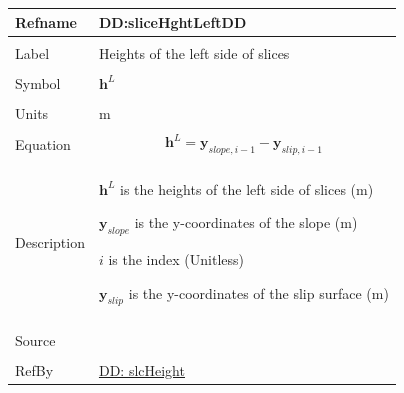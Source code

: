 \documentclass[12pt]{article}
\begin{document}
\noindent \begin{minipage}{\textwidth}
          \begin{tabular}{>{\raggedright}p{}>{\raggedright\arraybackslash}p{}}
          \toprule \textbf{Refname} & \textbf{DD:sliceHghtLeftDD}
          \label{DD:sliceHghtLeftDD}
          \\ \midrule \\
          Label & Heights of the left side of slices
          \\ \midrule \\
          Symbol & ${\mathbf{h}^{L}}$
          \\ \midrule \\
          Units & m
          \\ \midrule \\
          Equation & \begin{displaymath}
                     {\mathbf{h}^{L}}={\mathbf{y}_{slope,i-1}}-{\mathbf{y}_{slip,i-1}}
                     \end{displaymath}
          \\ \midrule \\
          Description & \begin{symbDescription}
                        \item{${\mathbf{h}^{L}}$ is the heights of the left side of slices (m)}
                        \item{${\mathbf{y}_{slope}}$ is the y-coordinates of the slope (m)}
                        \item{$i$ is the index (Unitless)}
                        \item{${\mathbf{y}_{slip}}$ is the y-coordinates of the slip surface (m)}
                        \end{symbDescription}
          \\ \midrule \\
          Source & \cite{fredlund1977}
          \\ \midrule \\
          RefBy & \hyperref[DD:slcHeight]{DD: slcHeight}
          \\ \bottomrule
          \end{tabular}
          \end{minipage}
\end{document}
